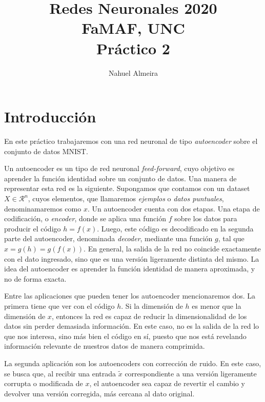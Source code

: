 \documentclass[10pt,twocolumn]{article}
\begin{document}
\author{Nahuel Almeira}

\title{Redes Neuronales 2020\\ FaMAF, UNC\\ Práctico 2}

\maketitle

\section{Introducción}

En este práctico trabajaremos con una red neuronal de tipo \emph{autoencoder} sobre el conjunto de datos MNIST.

Un autoencoder es un tipo de red neuronal \emph{feed-forward}, cuyo objetivo es aprender la función identidad sobre un conjunto de datos. Una manera de representar esta red es la siguiente. Supongamos que contamos con un dataset $X\in \mathcal{R}^n$, cuyos elementos, que llamaremos \emph{ejemplos} o \emph{datos puntuales}, denominamaremos como $x$. Un autoencoder cuenta con dos etapas. Una etapa de codificación, o \emph{encoder}, donde se aplica una función $f$ sobre los datos para producir el código $h = f(x)$. Luego, este código es decodificado en la segunda parte del autoencoder, denominada \emph{decoder}, mediante una función $g$, tal que $\hat{x} = g(h) = g(f(x))$. En general, la salida de la red no coincide exactamente con el dato ingresado, sino que es una versión ligeramente distinta del mismo. La idea del autoencoder es aprender la función identidad de manera aproximada, y no de forma exacta.

Entre las aplicaciones que pueden tener los autoencoder mencionaremos dos. La primera tiene que ver con el código $h$. Si la dimensión de $h$ es menor que la dimensión de $x$, entonces la red es capaz de reducir la dimensionalidad de los datos sin perder demasiada información. En este caso, no es la salida de la red lo que nos interesa, sino más bien el código en sí, puesto que nos está revelando información relevante de nuestros datos de manera comprimida.

La segunda aplicación son los autoencoders con corrección de ruido. En este caso, se busca que, al recibir una entrada $\tilde{x}$ correspondiente a una versión ligeramente corrupta o modificada de $x$, el autoencoder sea capaz de revertir el cambio y devolver una versión corregida, más cercana al dato original.
\end{document}
